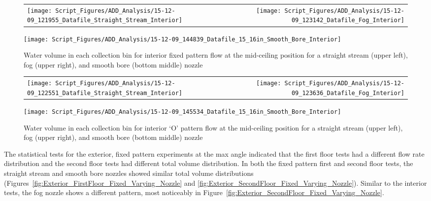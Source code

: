 \documentclass{article}
\begin{document}
\begin{figure}[!ht]
\begin{tabular*}{\textwidth}{lr}
\texttt{[image: Script\_Figures/ADD\_Analysis/15-12-09\_121955\_Datafile\_Straight\_Stream\_Interior]} &
\texttt{[image: Script\_Figures/ADD\_Analysis/15-12-09\_123142\_Datafile\_Fog\_Interior]} \\
\end{tabular*}
\centering
\texttt{[image: Script\_Figures/ADD\_Analysis/15-12-09\_144839\_Datafile\_15\_16in\_Smooth\_Bore\_Interior]}
\caption{Water volume in each collection bin for interior fixed pattern flow at the mid-ceiling position for a straight stream (upper left), fog (upper right), and smooth bore (bottom middle) nozzle}
\label{fig:Interior_Varying_Nozzle_Types_Fixed_Pattern}
\end{figure}

\begin{figure}[ht]
\begin{tabular*}{\textwidth}{lr}
\texttt{[image: Script\_Figures/ADD\_Analysis/15-12-09\_122551\_Datafile\_Straight\_Stream\_Interior]} &
\texttt{[image: Script\_Figures/ADD\_Analysis/15-12-09\_123636\_Datafile\_Fog\_Interior]} \\
\end{tabular*}
\centering
\texttt{[image: Script\_Figures/ADD\_Analysis/15-12-09\_145534\_Datafile\_15\_16in\_Smooth\_Bore\_Interior]}
\caption{Water volume in each collection bin for interior `O' pattern flow at the mid-ceiling position for a straight stream (upper left), fog (upper right), and smooth bore (bottom middle) nozzle}
\label{fig:Interior_Varying_Nozzle_Types_O_Pattern}
\end{figure}

\clearpage

The statistical tests for the exterior, fixed pattern experiments at the max angle indicated that the first floor tests had a different flow rate distribution and the second floor tests had different total volume distribution. In both the fixed pattern first and second floor tests, the straight stream and smooth bore nozzles showed similar total volume distributions (Figures~\ref{fig:Exterior_FirstFloor_Fixed_Varying_Nozzle} and \ref{fig:Exterior_SecondFloor_Fixed_Varying_Nozzle}). Similar to the interior tests, the fog nozzle shows a different pattern, most noticeably in Figure~\ref{fig:Exterior_SecondFloor_Fixed_Varying_Nozzle}. 
\end{document}
